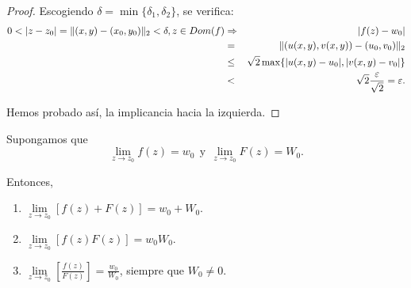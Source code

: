 \begin{proof}
Escogiendo $\delta = \min\{\delta_1, \delta_2\}$, se verifica:
\begin{eqnarray*}
0 < |z - z_0| = \lVert(x,y) - (x_0,y_0)\rVert_2 < \delta, z \in Dom(f) &\Rightarrow & |f(z) -w_0| \\
&=& \lVert(u(x,y), v(x,y)) - (u_0,v_0)\rVert_2 \\
&\leq & \sqrt{2} \max\{|u(x,y) -u_0|, |v(x,y) - v_0|\} \\
&< & \sqrt{2} \frac{\varepsilon}{\sqrt{2}} = \varepsilon.
\end{eqnarray*}

Hemos probado así, la implicancia hacia la izquierda.

\end{proof}

\begin{teorema} \label{AlgebraLimites}
Supongamos que
$$\lim_{z \to z_0} f(z) = w_0 ~~\mbox{y}~~ \lim_{z \to z_0} F(z)= W_0.$$

Entonces,

\begin{enumerate}
\item $\lim\limits_{z \to z_0} [f(z) + F(z)] = w_0 + W_0.$

\item $\lim\limits_{z \to z_0} [f(z)  F(z)] = w_0  W_0.$

\item $\lim\limits_{z \to z_0} \left[ \frac{f(z)}{F(z)} \right] = \frac{w_0}{W_0}$, siempre que $W_0 \neq 0$.
\end{enumerate}
\end{teorema}

